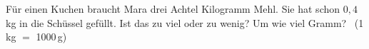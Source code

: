 \documentclass[11pt]{article}
\makeatletter
\newcommand{\aufg}[3]{\par\noindent\makebox[0pt][r]{#3}\begin{minipage}[t]{\linewidth}#1\end{minipage}\par}
\newcommand{\nr}[1]{\makebox[7mm][l]{\textbf{#1}}}
\newlength{\kr}
\newcommand{\karomerk}[2]{\protected@write\@auxout{}{\string\karoseite{#1}{#2}{\thepage}}}
\newcommand{\karoseite}[3]{\expandafter\xdef\csname karo@#1@#2\endcsname{#3}}
\makeatother
\begin{document}
\medskip
\aufg{\nr{6.}Für einen Kuchen braucht Mara drei Achtel Kilogramm Mehl. Sie hat schon $0{,}4$\,kg in die Schüssel gefüllt. Ist das zu viel oder zu wenig? Um wie viel Gramm? \ (1\,kg $=$ 1000\,g)}{}{{\scriptsize\color{mbgrau}Ziel\hspace{2mm}}}
\medskip
\par\vspace{3mm}\setlength{\kr}{\dimexpr\pagegoal-\pagetotal-10mm\relax}%
\ifdim\kr>12mm\karomerk{k}{T}\noindent{\scriptsize\color{mbgrau}Platz zum Rechnen}\par\nointerlineskip\vspace{1mm}\noindent
\begin{tikzpicture}\clip (0,0) rectangle ({\linewidth-0.5mm},\kr);\draw[black!16,line width=0.3pt,step=5mm] (0,0) grid (\linewidth,\kr);\end{tikzpicture}\fi\par
\end{document}
